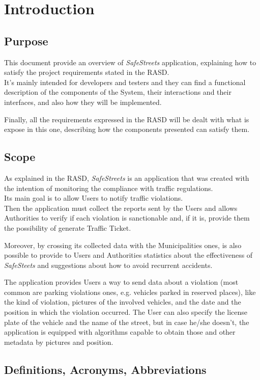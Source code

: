 \section{Introduction}

\subsection{Purpose}
This document provide an overview of \textit{SafeStreets} application, explaining how to satisfy the project requirements stated in the RASD.\\
It's mainly intended for developers and testers and they can find a functional description of the components of the System, their interactions and their interfaces, and also how they will be implemented.

Finally, all the requirements expressed in the RASD will be dealt with what is expose in this one, describing how the components presented can satisfy them.

\subsection{Scope}
As explained in the RASD, \textit{SafeStreets} is an application that was created with the intention of monitoring the compliance with traffic regulations.\\
Its main goal is to allow Users to notify traffic violations.\\
Then the application must collect the reports sent by the Users and allows Authorities to verify if each violation is sanctionable and, if it is, provide them the possibility of generate Traffic Ticket.

Moreover, by crossing its collected data with the Municipalities ones, is also possible to provide to Users and Authorities statistics about the effectiveness of \textit{SafeSteets} and suggestions about how to avoid recurrent accidents.

The application provides Users a way to send data about a violation (most common are parking violations ones, e.g. vehicles parked in reserved places), like the kind of violation, pictures of the involved vehicles, and the date and the position in which the violation occurred. The User can also specify the license plate of the vehicle and the name of the street, but in case he/she doesn't, the application is equipped with algorithms capable to obtain those and other metadata by pictures and position.

\subsection{Definitions, Acronyms, Abbreviations}
